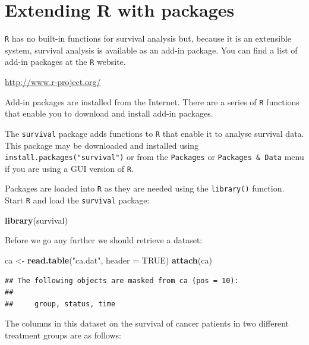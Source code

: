 \documentclass[12pt,]{book}
\newenvironment{Shaded}{\begin{snugshade}}{\end{snugshade}}
\newcommand{\KeywordTok}[1]{\textcolor[rgb]{0.13,0.29,0.53}{\textbf{#1}}}
\newcommand{\DataTypeTok}[1]{\textcolor[rgb]{0.13,0.29,0.53}{#1}}
\newcommand{\StringTok}[1]{\textcolor[rgb]{0.31,0.60,0.02}{#1}}
\newcommand{\OtherTok}[1]{\textcolor[rgb]{0.56,0.35,0.01}{#1}}
\newcommand{\NormalTok}[1]{#1}
\theoremstyle{definition}
\theoremstyle{definition}
\theoremstyle{definition}
\theoremstyle{remark}
\begin{document}
\hypertarget{exercise5}{%
\chapter{Extending R with packages}\label{exercise5}}

\texttt{R} has no built-in functions for survival analysis but, because
it is an extensible system, survival analysis is available as an add-in
package. You can find a list of add-in packages at the \texttt{R}
website.

\url{http://www.r-project.org/}

Add-in packages are installed from the Internet. There are a series of
\texttt{R} functions that enable you to download and install add-in
packages.

The \texttt{survival} package adds functions to \texttt{R} that enable
it to analyse survival data. This package may be downloaded and
installed using \texttt{install.packages("survival")} or from the
\texttt{Packages} or \texttt{Packages\ \&\ Data} menu if you are using a
GUI version of \texttt{R}.

Packages are loaded into \texttt{R} as they are needed using the
\texttt{library()} function. Start \texttt{R} and load the
\texttt{survival} package:

\begin{Shaded}
\begin{Highlighting}[]
\KeywordTok{library}\NormalTok{(survival)}
\end{Highlighting}
\end{Shaded}

Before we go any further we should retrieve a dataset:

\begin{Shaded}
\begin{Highlighting}[]
\NormalTok{ca <-}\StringTok{ }\KeywordTok{read.table}\NormalTok{(}\StringTok{"ca.dat"}\NormalTok{, }\DataTypeTok{header =} \OtherTok{TRUE}\NormalTok{)}
\KeywordTok{attach}\NormalTok{(ca)}
\end{Highlighting}
\end{Shaded}

\begin{verbatim}
## The following objects are masked from ca (pos = 10):
## 
##     group, status, time
\end{verbatim}

The columns in this dataset on the survival of cancer patients in two
different treatment groups are as follows:
\end{document}
